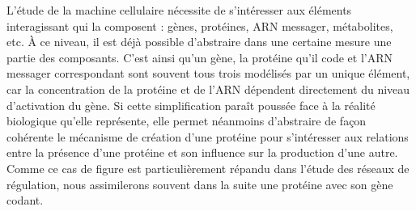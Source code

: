 
L'étude de la machine cellulaire nécessite de s'intéresser aux éléments interagissant
qui la composent :
gènes, protéines, ARN messager, métabolites, etc.
% 
À ce niveau, il est déjà possible d'abstraire dans une certaine mesure
une partie des composants.
C'est ainsi qu'un gène, la protéine qu'il code et l'ARN messager correspondant sont
souvent tous trois modélisés par un unique élément,
car la concentration de la protéine et de l'ARN
dépendent directement du niveau d'activation du gène.
Si cette simplification paraît poussée face à la réalité biologique qu'elle représente,
elle permet néanmoins d'abstraire de façon cohérente le mécanisme de création d'une protéine
pour s'intéresser aux relations
entre la présence d'une protéine et son influence sur la production d'une autre.
Comme ce cas de figure est particulièrement répandu dans l'étude des réseaux de régulation,
nous assimilerons souvent dans la suite une protéine avec son gène codant.

